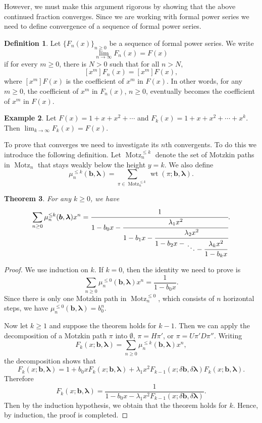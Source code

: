 \documentclass[oneside]{book}
\numberwithin{equation}{section}
\newtheorem{thm}{Theorem}[section]
\theoremstyle{definition}
\newtheorem{exam}[thm]{Example}
\newtheorem{defn}[thm]{Definition}
\newcommand\Motz{\operatorname{Motz}}
\newcommand\wt{\operatorname{wt}}
\renewcommand\vec[1]{\bm{#1}}
\newcommand\vb{\vec{b}}
\newcommand\vla{\vec{\lambda}}
\begin{document}
However, we must make this argument rigorous by showing that the above
continued fraction converges. Since we are working with formal power
series we need to define convergence of a sequence of formal power
series.

\begin{defn}
  Let \( \{ F_n(x)\}_{n\ge 0} \) be a sequence of formal power
  series. We write
  \[
    \lim_{n\to \infty} F_n(x) = F(x)
  \]
  if for every \( m\ge0 \), there is \( N>0 \)
  such that for all \( n>N \),
  \[
    [x^m] F_n(x) = [x^m] F(x),
  \]
  where \( [x^m] F(x) \) is the coefficient of \( x^m \) in
  \( F(x) \). In other words, for any \( m\ge0 \), the coefficient of
  \( x^m \) in \( F_n(x) \), \( n\ge0 \), eventually becomes the
  coefficient of \( x^m \) in \( F(x) \).
\end{defn}

\begin{exam}
  Let \( F(x) = 1+x+x^2 + \cdots \) and
  \( F_k(x) = 1+x+x^2 + \cdots + x^k \). Then
  \( \lim_{k\to \infty} F_k(x) = F(x) \).
\end{exam}


To prove that  converges we need to investigate its
\( n \)th convergents. To do this we introduce the following
definition. Let \( \Motz^{\le k}_n \) denote the set of Motzkin paths
in \( \Motz_n \) that stays weakly below the height \( y=k \). We also
define
\[
  \mu^{\le k}_n(\vb, \vla) = \sum_{\pi\in \Motz^{\le k}_n}  \wt(\pi; \vb,\vla).
\]

\begin{thm}\label{thm:14}
  For any \( k\ge0 \), we have
\[
  \sum_{n\ge0} \mu_n^{\le k}(\vb,\vla)x^n = 
  \cfrac{1}{
    1-b_0x- \cfrac{\lambda_1x^2}{
      1-b_1x- \cfrac{\lambda_2x^2}{
        1-b_2x- \genfrac{}{}{0pt}{1}{}{\displaystyle\ddots -
          \cfrac{\lambda_kx^2}{1-b_kx}}} }}.
\]
\end{thm}

\begin{proof}
  We use induction on \( k \).
  If \( k=0 \), then the identity we need to prove is
  \[
    \sum_{n\ge0} \mu_n^{\le 0}(\vb,\vla)x^n = \frac{1}{1-b_0x}.
  \]
  Since there is only one Motzkin path in \( \Motz^{\le 0}_n \), which
  consists of \( n \) horizontal steps, we have
  \( \mu_n^{\le 0}(\vb,\vla) = b_0^n \).

  Now let \( k\ge 1 \) and suppose the theorem holds for \( k-1 \). Then
  we can apply the decomposition of a Motzkin path \( \pi \) into
  \( \emptyset \), \( \pi=H\pi' \), or \( \pi = U\pi'D\pi'' \).
  Writing
  \[
    F_k(x;\vb,\vla) = \sum_{n\ge0} \mu_n^{\le k}(\vb,\vla)x^n,
  \]
  the decomposition shows that
  \[
    F_k(x;\vb,\vla) = 1 + b_0x F_k(x;\vb,\vla) + \lambda_1 x^2
    F_{k-1}(x;\delta\vb,\delta\vla) F_k(x;\vb,\vla).
  \]
  Therefore
  \[
    F_k(x;\vb,\vla) = \frac{1}{1 - b_0x - \lambda_1 x^2
      F_{k-1}(x;\delta\vb, \delta\vla)}.
  \]
  Then by the induction hypothesis, we obtain that the theorem holds
  for \( k \). Hence, by induction, the proof is completed.
\end{proof}
\end{document}

